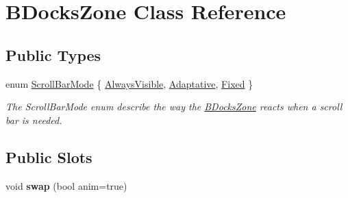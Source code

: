 \hypertarget{class_b_docks_zone}{\section{\-B\-Docks\-Zone \-Class \-Reference}
\label{class_b_docks_zone}
}
\subsection*{\-Public \-Types}
\begin{DoxyCompactItemize}
\item 
enum \hyperlink{class_b_docks_zone_aaa04c632b39dce77b61a3a28b7418fdd}{\-Scroll\-Bar\-Mode} \{ \hyperlink{class_b_docks_zone_aaa04c632b39dce77b61a3a28b7418fdda56cc1afb42c3bd98e3e64599883383a5}{\-Always\-Visible}, 
\hyperlink{class_b_docks_zone_aaa04c632b39dce77b61a3a28b7418fddabef53da1c509bfc9156ed6d8d8617972}{\-Adaptative}, 
\hyperlink{class_b_docks_zone_aaa04c632b39dce77b61a3a28b7418fddae1dd9bb823904efc8224bffef1fe6f22}{\-Fixed}
 \}
\begin{DoxyCompactList}\small\item\em \-The \-Scroll\-Bar\-Mode enum describe the way the \hyperlink{class_b_docks_zone}{\-B\-Docks\-Zone} reacts when a scroll bar is needed. \end{DoxyCompactList}\end{DoxyCompactItemize}
\subsection*{\-Public \-Slots}
\begin{DoxyCompactItemize}
\item 
\hypertarget{class_b_docks_zone_a41a7757fb2b8b4cc5c27f9d5a0e3a841}{void {\bfseries swap} (bool anim=true)}\label{class_b_docks_zone_a41a7757fb2b8b4cc5c27f9d5a0e3a841}

\end{DoxyCompactItemize}
